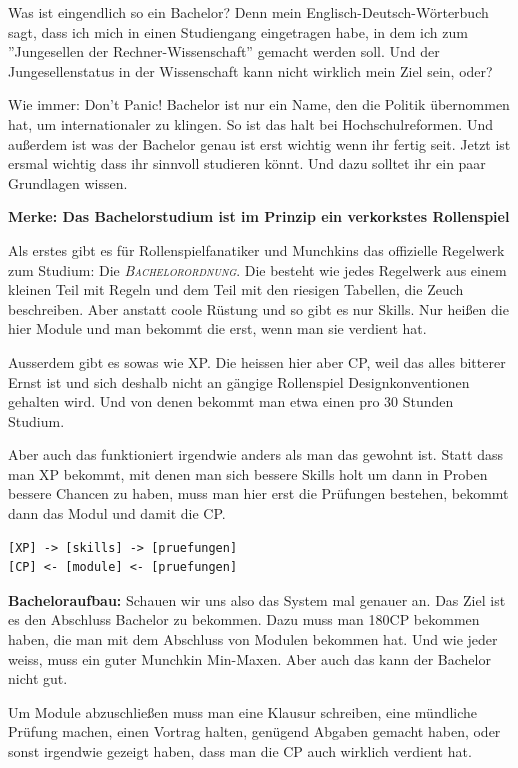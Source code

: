 Was ist eingendlich so ein Bachelor? Denn mein Englisch-Deutsch-W\"orterbuch
sagt, dass ich mich in einen Studiengang eingetragen habe, in dem ich zum
''Jungesellen der Rechner-Wissenschaft'' gemacht werden soll. Und der
Jungesellenstatus in der Wissenschaft kann nicht wirklich mein Ziel sein, oder?

Wie immer: Don't Panic! Bachelor ist nur ein Name, den die Politik \"ubernommen
hat, um internationaler zu klingen.  So ist das halt bei Hochschulreformen. Und
au{\ss}erdem ist was der Bachelor genau ist erst wichtig wenn ihr fertig seit.
Jetzt ist ersmal wichtig dass ihr sinnvoll studieren k\"onnt. Und dazu solltet
ihr ein paar Grundlagen wissen.

\textbf{Merke: Das Bachelorstudium ist im Prinzip ein verkorkstes Rollenspiel}

Als erstes gibt es f\"ur Rollenspielfanatiker und Munchkins das offizielle
Regelwerk zum Studium: Die \textsc{\textit{Bachelorordnung}}. Die besteht wie jedes
Regelwerk aus einem kleinen Teil mit Regeln
und dem Teil mit den riesigen
Tabellen, die Zeuch beschreiben. Aber anstatt coole R\"ustung und so gibt es
nur Skills. Nur hei{\ss}en die hier Module und man bekommt die erst, wenn man sie
verdient hat.

Ausserdem gibt es sowas wie XP. Die heissen hier aber CP, weil das alles
bitterer Ernst ist und sich deshalb nicht an g\"angige Rollenspiel
Designkonventionen gehalten wird. Und von denen bekommt man etwa einen pro 30
Stunden Studium.

Aber auch das funktioniert irgendwie anders als man das gewohnt ist. Statt dass
man XP bekommt, mit denen man sich bessere Skills holt um dann in Proben
bessere Chancen zu haben, muss man hier erst die Pr\"ufungen bestehen, bekommt
dann das Modul und damit die CP.

{\large
\begin{verbatim}
[XP] -> [skills] -> [pruefungen]
[CP] <- [module] <- [pruefungen]
\end{verbatim}}

\textbf{Bacheloraufbau:}
Schauen wir uns also das System mal genauer an.
Das Ziel ist es den Abschluss Bachelor zu bekommen. Dazu muss man 180CP
bekommen haben, die man mit dem Abschluss von Modulen bekommen hat. Und wie
jeder weiss, muss ein guter Munchkin Min-Maxen. Aber auch das kann der Bachelor
nicht gut.

Um Module abzuschlie\ss en muss man eine Klausur schreiben, eine m\"undliche
Pr\"ufung machen, einen Vortrag halten, gen\"ugend Abgaben gemacht haben, oder
sonst irgendwie gezeigt haben, dass man die CP auch wirklich verdient hat.


